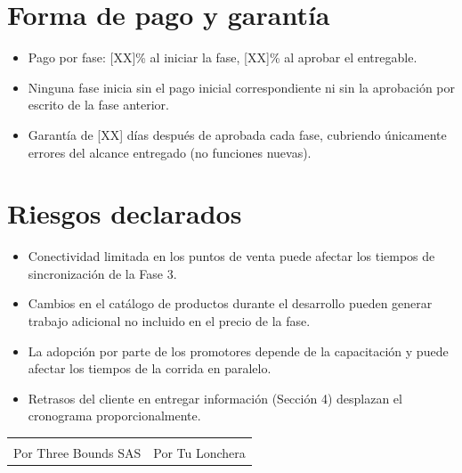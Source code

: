 \documentclass[11pt,a4paper]{article}
\begin{document}
\section{Forma de pago y garantía}
\begin{itemize}
    \item Pago por fase: [XX]\% al iniciar la fase, [XX]\% al aprobar el entregable.
    \item Ninguna fase inicia sin el pago inicial correspondiente ni sin la aprobación por escrito de la fase anterior.
    \item Garantía de [XX] días después de aprobada cada fase, cubriendo únicamente errores del alcance entregado (no funciones nuevas).
\end{itemize}

\section{Riesgos declarados}
\begin{itemize}
    \item Conectividad limitada en los puntos de venta puede afectar los tiempos de sincronización de la Fase 3.
    \item Cambios en el catálogo de productos durante el desarrollo pueden generar trabajo adicional no incluido en el precio de la fase.
    \item La adopción por parte de los promotores depende de la capacitación y puede afectar los tiempos de la corrida en paralelo.
    \item Retrasos del cliente en entregar información (Sección 4) desplazan el cronograma proporcionalmente.
\end{itemize}

\vspace{1cm}
\noindent
\begin{tabularx}{\textwidth}{XX}
\underline{\hspace{5cm}} & \underline{\hspace{5cm}} \\
Por Three Bounds SAS & Por Tu Lonchera \\
\end{tabularx}
\end{document}

